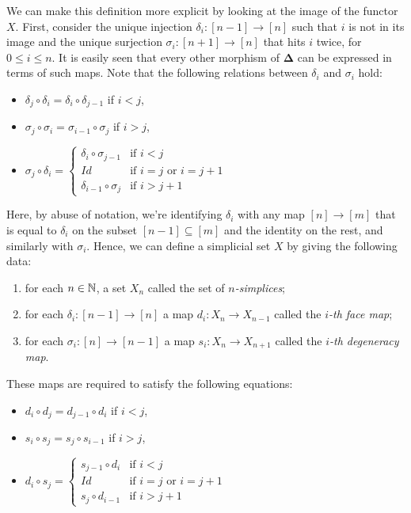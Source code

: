 \documentclass[TFM.tex]{subfiles}
\begin{document}
We can make this definition more explicit by looking at the image of the functor $X$. First, consider the unique injection $\delta_i:[n-1]\to[n]$ such that $i$ is not in its image and the unique surjection $\sigma_i:[n+1]\to [n]$ that hits $i$ twice, for $0\leq i\leq n$. It is easily seen that every other morphism of $\mathbf{\Delta}$ can be expressed in terms of such maps. Note that the following relations between $\delta_i$ and $\sigma_i$ hold:
\begin{itemize}
\item $\delta_j\circ\delta_i=\delta_i\circ \delta_{j-1}$ if $i<j$,
\item $\sigma_j\circ \sigma_i=\sigma_{i-1}\circ \sigma_j$ if $i>j$,
\item $\sigma_j\circ\delta_i=\begin{cases}
\delta_i\circ \sigma_{j-1} &\text{if } i<j\\
Id & \text{if } i=j\text{ or }i=j+1\\
\delta_{i-1}\circ \sigma_j & \text{if }i>j+1
\end{cases}$
\end{itemize}
Here, by abuse of notation, we're identifying $\delta_i$ with any map $[n]\to[m]$ that is equal to $\delta_i$ on the subset $[n-1]\subseteq [m]$ and the identity on the rest, and similarly with $\sigma_i$. Hence, we can define a simplicial set $X$ by giving the following data:
\begin{enumerate}
\item for each $n\in\mathbb{N}$, a set $X_n$ called the set of \emph{$n$-simplices};
\item for each $\delta_i:[n-1]\to[n]$ a map $d_i:X_n\to X_{n-1}$ called the \emph{$i$-th face map};
\item for each $\sigma_i:[n]\to[n-1]$ a map $s_i:X_n\to X_{n+1}$ called the \emph{$i$-th degeneracy map}.
\end{enumerate} 
These maps are required to satisfy the following equations:
\begin{itemize}
\item $d_i \circ d_j  = d_{j-1} \circ d_i$ if $i<j$,
\item $s_i \circ s_j  = s_j \circ s_{i-1}$ if $i>j$,
\item $d_i \circ s_j =  \begin{cases} s_{j-1} \circ d_i &  \text{if }  i < j \\ Id & \text{if }  i = j \text{ or } i = j+1 \\ s_j \circ d_{i-1} &  \text{if }i > j+1  \end{cases}$
\end{itemize}
\end{document}
